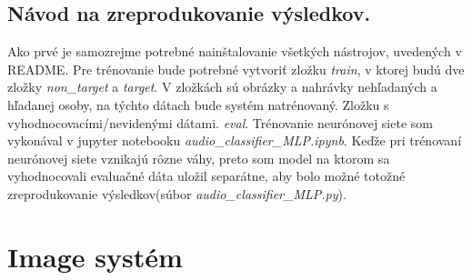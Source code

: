 \documentclass{article}
\begin{document}
    \subsection{Návod na zreprodukovanie výsledkov.}
    \Large{Ako prvé je samozrejme potrebné nainštalovanie všetkých nástrojov, uvedených v README. Pre trénovanie bude potrebné vytvoriť zložku \textit{train}, v ktorej budú dve zložky \textit{non\_target} a \textit{target}. V zložkách sú obrázky a nahrávky nehľadaných a hľadanej osoby, na týchto dátach bude systém natrénovaný. Zložku s vyhodnocovacími/nevidenými dátami. \textit{eval}. Trénovanie neurónovej siete som vykonával v jupyter notebooku \textit{audio\_classifier\_MLP.ipynb}. Keďže pri trénovaní neurónovej siete vznikajú rôzne váhy, preto som model na ktorom sa vyhodnocovali evaluačné dáta uložil separátne, aby bolo možné totožné zreprodukovanie výsledkov(súbor \textit{audio\_classifier\_MLP.py}).}
    \newpage
    \section{Image systém}
\end{document}
